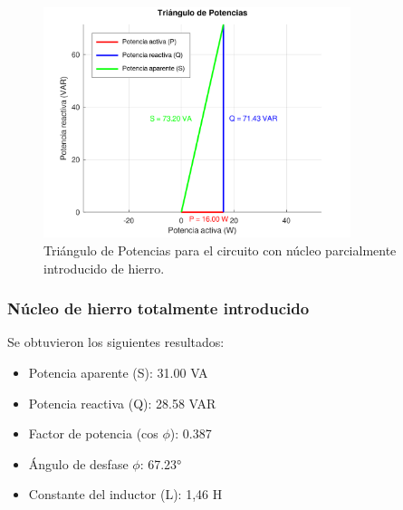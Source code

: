 \documentclass{article}
\begin{document}
                        \begin{figure}[H]
                            \centering
                            \includegraphics[width=0.8\textwidth]{graficoParcialHierro.png}
                            \caption{Triángulo de Potencias para el circuito con núcleo parcialmente introducido de hierro.}
                            \label{fig:graficoParcialHierro}
                        \end{figure}


                    \subsubsection{Núcleo de hierro totalmente introducido}

                        Se obtuvieron los siguientes resultados:
                        \begin{itemize}
                            \item Potencia aparente (S): 31.00 VA
                            \item Potencia reactiva (Q): 28.58 VAR
                            \item Factor de potencia (cos $\phi$): 0.387
                            \item Ángulo de desfase $\phi$: 67.23°
                            \item Constante del inductor (L): 1,46 H
                        \end{itemize}
\end{document}
